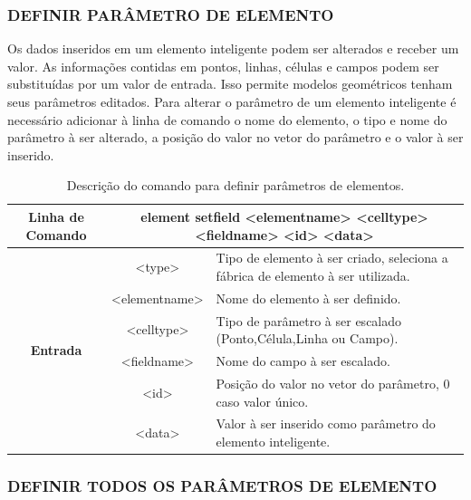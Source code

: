 \documentclass[a4paper,12pt]{monografia}
\theoremstyle{plain}
\theoremstyle{definition}
\theoremstyle{remark}
\begin{document}
\subsubsection{DEFINIR PARÂMETRO DE ELEMENTO}\label{sec:set_field_element}

Os dados inseridos em um elemento inteligente podem ser alterados e receber um valor. As informações contidas em pontos, linhas, células e campos podem ser substituídas por um valor de entrada. Isso permite modelos geométricos tenham seus parâmetros editados. Para alterar o parâmetro de um elemento inteligente é necessário adicionar à linha de comando o nome do elemento, o tipo e nome do parâmetro à ser alterado, a posição do valor no vetor do parâmetro e o valor à ser inserido.

\begin{center}
	\begin{table}[!htbp]
		\begin{tabular}{|c|c|m{}|}
			\hline
			\textbf{Linha de Comando} & \multicolumn{2}{c|}{element set\underline{\space\space}field <element\underline{\space\space}name> <cell\underline{\space\space}type> <field\underline{\space\space}name> <id> <data>} \\
			\hline
			\multirow{6}{*}{\textbf{Entrada}} & <type> & Tipo de elemento à ser criado, seleciona a fábrica de elemento à ser utilizada. \\
			
			& <element\underline{\space\space}name> & Nome do elemento à ser definido. \\
			& <cell\underline{\space\space}type> & Tipo de parâmetro à ser escalado (Ponto,Célula,Linha ou Campo). \\
			& <field\underline{\space\space}name> & Nome do campo à ser escalado. \\
			& <id> & Posição do valor no vetor do parâmetro, 0 caso valor único. \\
			& <data> & Valor à ser inserido como parâmetro do elemento inteligente. \\
			\hline
		\end{tabular}
		\caption{Descrição do comando para definir parâmetros de elementos.}
		\label{tab:set_field_element}
	\end{table}
\end{center}

\subsubsection{DEFINIR TODOS OS PARÂMETROS DE ELEMENTO}\label{sec:set_all_field_element}
\end{document}
